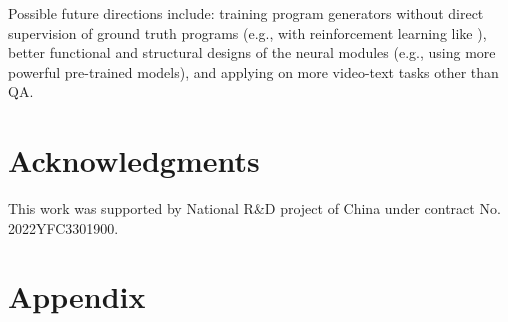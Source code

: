 \documentclass[letterpaper]{article} %
\begin{document}
Possible future directions include: training program generators without direct supervision of ground truth programs (e.g., with reinforcement learning like \cite{Mao2019TheNC}), better functional and structural designs of the neural modules (e.g., using more powerful pre-trained models), and applying on more video-text tasks other than QA.

\section{Acknowledgments}
This work was supported by National R\&D project of China under contract No. 2022YFC3301900.





\section{Appendix}
\end{document}
